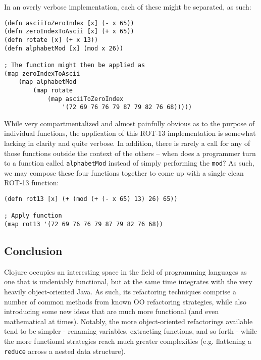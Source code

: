 In an overly verbose implementation, each of these might be separated, as such:

\begin{verbatim}
(defn asciiToZeroIndex [x] (- x 65))
(defn zeroIndexToAscii [x] (+ x 65))
(defn rotate [x] (+ x 13))
(defn alphabetMod [x] (mod x 26))

; The function might then be applied as
(map zeroIndexToAscii
    (map alphabetMod
        (map rotate
            (map asciiToZeroIndex 
                '(72 69 76 76 79 87 79 82 76 68)))))
\end{verbatim}

While very compartmentalized and almost painfully obvious as to the purpose of individual functions, the application of this ROT-13 implementation is somewhat lacking in clarity and quite verbose. In addition, there is rarely a call for any of those functions outside the context of the others -- when does a programmer turn to a function called \verb!alphabetMod! instead of simply performing the \verb!mod!? As such, we may compose these four functions together to come up with a single clean ROT-13 function:

\begin{verbatim}
(defn rot13 [x] (+ (mod (+ (- x 65) 13) 26) 65))

; Apply function
(map rot13 '(72 69 76 76 79 87 79 82 76 68))
\end{verbatim}

\subsection{Conclusion}

Clojure occupies an interesting space in the field of programming languages as one that is undeniably functional, but at the same time integrates with the very heavily object-oriented Java. As such, its refactoring techniques comprise a number of common methods from known OO refactoring strategies, while also introducing some new ideas that are much more functional (and even mathematical at times). Notably, the more object-oriented refactorings available tend to be simpler - renaming variables, extracting functions, and so forth - while the more functional strategies reach much greater complexities (e.g. flattening a \verb!reduce! across a nested data structure).

